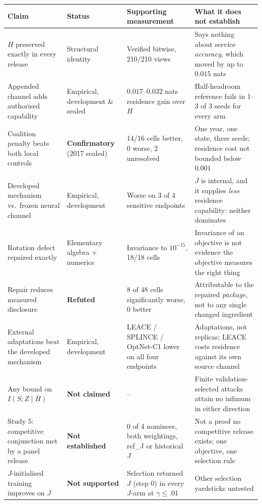 \begin{tabular}{@{}p{4.0cm}p{2.5cm}p{3.7cm}p{4.9cm}@{}}
\toprule
Claim & Status & Supporting measurement & What it does not establish \\
\midrule
$H$ preserved exactly in every release & Structural identity & Verified bitwise, 210/210 views & Says nothing about service \emph{accuracy}, which moved by up to $0.015$ nats \\
\addlinespace[1.5pt]
Appended channel adds authorised capability & Empirical, development \& sealed & $0.017$--$0.032$ nats residence gain over $H$ & Half-headroom reference fails in 1--3 of 3 seeds for every arm \\
\addlinespace[1.5pt]
Coalition penalty beats both local controls & \textbf{Confirmatory} (2017 sealed) & 14/16 cells better, 0 worse, 2 unresolved & One year, one state, three seeds; residence cost not bounded below $0.001$ \\
\addlinespace[1.5pt]
Developed mechanism vs.\ frozen neural channel & Empirical, development & Worse on 3 of 4 sensitive endpoints & $J$ is internal, and it supplies \emph{less} residence capability: neither dominates \\
\addlinespace[1.5pt]
Rotation defect repaired exactly & Elementary algebra $+$ numerics & Invariance to $10^{-15}$, 18/18 cells & Invariance of an objective is not evidence the objective measures the right thing \\
\addlinespace[1.5pt]
Repair reduces measured disclosure & \textbf{Refuted} & 8 of 48 cells significantly worse, 0 better & Attributable to the repaired \emph{package}, not to any single changed ingredient \\
\addlinespace[1.5pt]
External adaptations beat the developed mechanism & Empirical, development & LEACE / SPLINCE / OptNet-C1 lower on all four endpoints & Adaptations, not replicas; LEACE costs residence against its own source channel \\
\addlinespace[1.5pt]
Any bound on $I(S;Z\mid H)$ & \textbf{Not claimed} & -- & Finite validation-selected attacks attain no infimum in either direction \\
\addlinespace[1.5pt]
Study 5: competitive conjunction met by a panel release & \textbf{Not established} & 0 of 4 nominees, both weightings, ref\_J or historical $J$ & Not a proof no competitive release exists; one objective, one selection rule \\
\addlinespace[1.5pt]
$J$-initialised training improves on $J$ & \textbf{Not supported} & Selection returned $J$ (step 0) in every $J$-arm at $\gamma\le.01$ & Other selection yardsticks untested \\

\end{tabular}
